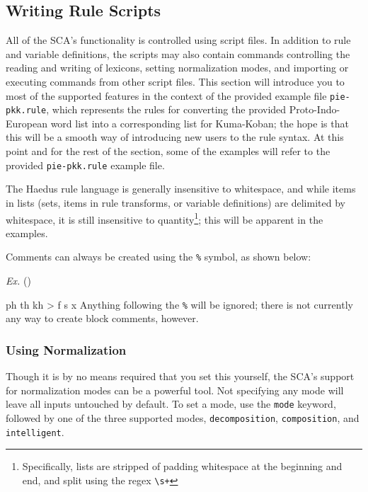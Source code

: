 \documentclass[10pt,letterpaper]{article}
\newcounter{excounter}
\newenvironment{vex}[1]{
	\refstepcounter{excounter}
	\noindent\emph{Ex.} (\arabic{excounter}\label{#1})
	\verbatim
}{\endverbatim}
\begin{document}

\subsection{Writing Rule Scripts}
\label{sec:writing_rule_scripts}
All of the SCA's functionality is controlled using script files. In addition to rule and variable definitions, the scripts may also contain commands controlling the reading and writing of lexicons, setting normalization modes, and importing or executing commands from other script files. This section will introduce you to most of the supported features in the context of the provided example file \texttt{pie-pkk.rule}, which represents the rules for converting the provided Proto-Indo-European word list into a corresponding list for Kuma-Koban; the hope is that this will be a smooth way of introducing new users to the rule syntax. At this point and for the rest of the section, some of the examples will refer to the provided \texttt{pie-pkk.rule} example file.

The Haedus rule language is generally insensitive to whitespace, and while items in lists (sets, items in rule transforms, or variable definitions) are delimited by whitespace, it is still insensitive to quantity\footnote{Specifically, lists are stripped of padding whitespace at the beginning and end, and split using the regex \texttt{\textbackslash\hspace{0pt}s+}}; this will be apparent in the examples. 

Comments can always be created using the \texttt{\%} symbol, as shown below:

\begin{vex}{ex:comment}
ph th kh > f s x %
\end{vex}
\noindent
Anything following the \texttt{\%} will be ignored; there is not currently any way to create block comments, however. 


\subsubsection{Using Normalization} 
\label{sub:using_normalization}
Though it is by no means required that you set this yourself, the SCA's support for normalization modes can be a powerful tool. Not specifying any mode will leave all inputs untouched by default. To set a mode, use the \texttt{mode} keyword, followed by one of the three supported modes, \texttt{decomposition}, \texttt{composition}, and \texttt{intelligent}.
\end{document}
